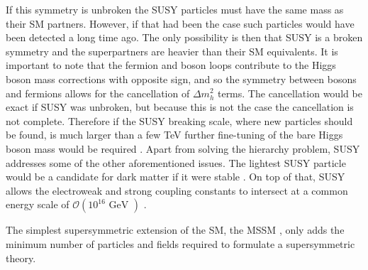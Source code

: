 If this symmetry is unbroken the \ac{SUSY} particles must
have the same mass as their \ac{SM} partners. However, if that had 
been the case such particles would have been detected a long time ago. The 
only possibility is then that \ac{SUSY} is a broken symmetry and the superpartners
are heavier than their \ac{SM} equivalents. It is important to note
that the fermion and boson loops contribute to the Higgs boson
mass corrections with opposite sign, and so the symmetry between bosons and fermions 
allows for the cancellation of $\Delta m_h^2$ terms. The cancellation
would be exact if \ac{SUSY} was unbroken, but because this is not the case the
cancellation is not complete. Therefore if the \ac{SUSY} breaking scale, where
new particles should be found, is much larger than a few TeV further fine-tuning of
the bare Higgs boson mass would be required \cite{MSSM-carena-haber,SUSY-primer}.
Apart from solving the hierarchy problem, \ac{SUSY} addresses some
of the other aforementioned issues. The lightest \ac{SUSY} particle
would be a candidate for dark matter if it were stable \cite{SUSY-primer}. On top of that,
\ac{SUSY} allows the electroweak and strong coupling
constants to intersect at a common energy scale of $\mathcal{O}(10^{16} \text{ GeV })$ \cite{GUT-LEP}. 

The simplest supersymmetric extension of the \ac{SM}, the \ac{MSSM} \cite{SUSY-primer}, only adds the minimum
number of particles and fields required to formulate a supersymmetric theory.

